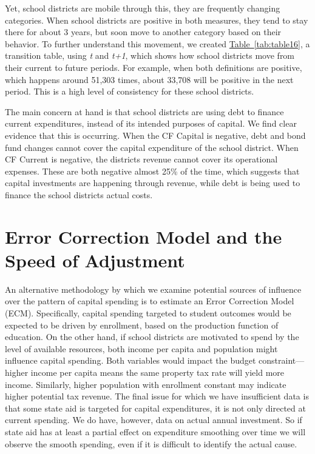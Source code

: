 Yet, school districts are mobile through this, they are frequently changing categories. When school districts are positive in both measures, they tend to stay there for about 3 years, but soon move to another category based on their behavior. To further understand this movement, we created \hyperref[tab:table16]{Table~\ref*{tab:table16}}, a transition table, using \textit{t} and \textit{t+1}, which shows how school districts move from their current to future periods. For example, when both definitions are positive, which happens around 51,303 times, about 33,708 will be positive in the next period. This is a high level of consistency for these school districts. 

The main concern at hand is that school districts are using debt to finance current expenditures, instead of its intended purposes of capital. We find clear evidence that this is occurring. When the CF Capital is negative, debt and bond fund changes cannot cover the capital expenditure of the school district. When CF Current is negative, the districts revenue cannot cover its operational expenses. These are both negative almost 25\% of the time, which suggests that capital investments are happening through revenue, while debt is being used to finance the school districts actual costs. 

\section{Error Correction Model and the Speed of Adjustment}

An alternative methodology by which we examine potential sources of influence over the pattern of capital spending is to estimate an Error Correction Model (ECM). Specifically, capital spending targeted to student outcomes would be expected to be driven by enrollment, based on the production function of education. On the other hand, if school districts are motivated to spend by the level of available resources, both income per capita and population might influence capital spending. Both variables would impact the budget constraint— higher income per capita means the same property tax rate will yield more income. Similarly, higher population with enrollment constant may indicate higher potential tax revenue. The final issue for which we have insufficient data is that some state aid is targeted for capital expenditures, it is not only directed at current spending. We do have, however, data on actual annual investment. So if state aid has at least a partial effect on expenditure smoothing over time we will observe the smooth spending, even if it is difficult to identify the actual cause.

